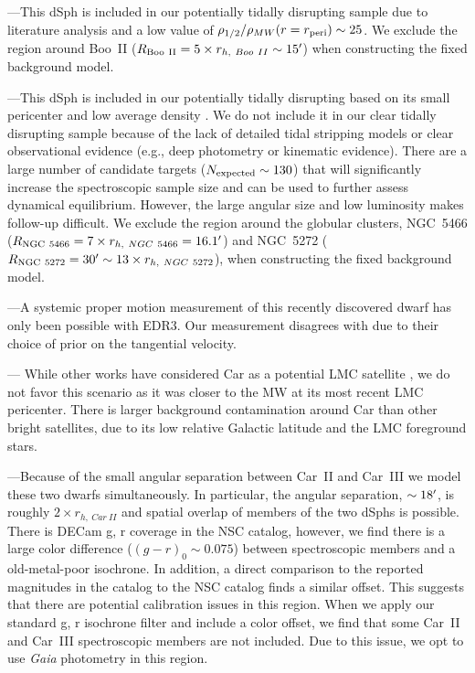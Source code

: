 \documentclass[twocolumn]{aastex63}
\begin{document}
---This dSph is included in our potentially tidally disrupting sample due to literature analysis  \citep{Longeard2021arXiv210710849L, Filion2021ApJ...923..218F} and a low value of $\rho_{1/2}/\rho_{MW}(r=r_{\rm peri})\sim 25$.  {We exclude the region around Boo~II ($R_{\rm Boo~II}=5\times r_{h,~Boo~II}\sim 15\mbox{$^\prime$}$) when constructing the fixed background model.}


---This dSph is included in our potentially  tidally disrupting based on its small pericenter and low average density  \citep{Carlin2018ApJ...865....7C}. We do not include it in our clear tidally disrupting sample because of the lack of detailed tidal stripping models or clear observational evidence (e.g., deep photometry or kinematic evidence).
There are a large number of candidate targets ($N_{\rm expected} \sim130$) that will significantly increase the spectroscopic sample size and can be used to further assess dynamical equilibrium. However, the large angular size and low luminosity makes follow-up difficult.  
{We exclude the region around the globular clusters, NGC~5466 ($R_{\rm NGC~5466}=7\times r_{h,~NGC~5466}= 16.1\mbox{$^\prime$}$) and NGC~5272 ($R_{\rm NGC~5272}=30\mbox{$^\prime$} \sim 13 \times r_{h,~NGC~5272}$), when constructing the fixed background model.}


---A systemic proper motion measurement of this recently discovered dwarf has only been possible with EDR3. Our measurement disagrees with \citet{McConnachie2020RNAAS...4..229M} due to their choice of prior on the tangential velocity.  

---
While other works have considered Car as a potential LMC satellite \citep{Pardy2020MNRAS.492.1543P}, we do not favor this scenario as it was closer to the MW at its most recent LMC pericenter.
There is larger background contamination around Car than other bright satellites, due to its low relative Galactic latitude and the LMC foreground stars.


---Because of the small angular separation between Car~II and Car~III  we model these two dwarfs simultaneously.  In particular, the angular separation, $\sim18\mbox{$^\prime$}$, is roughly $2\times r_{h,~Car~II}$ and spatial overlap of members of the two dSphs is possible.
There is DECam g, r coverage in the NSC catalog, however, we find there is a large color difference ($(g-r)_0\sim0.075$) between spectroscopic members \citep{Li2018ApJ...857..145L} and a old-metal-poor isochrone. In addition,  a direct comparison to the reported magnitudes in the \citet{Li2018ApJ...857..145L} catalog to the NSC catalog finds a similar offset. This suggests that there are potential calibration issues in  this region. 
When we apply our standard g, r isochrone filter and include a color offset, we find that some  Car~II and Car~III spectroscopic members are not included.  Due to this issue, we opt to  use {\it Gaia} photometry in this region. 
\end{document}
